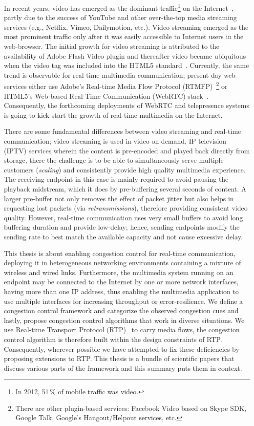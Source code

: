 In recent years, video has emerged as the dominant traffic\footnote{In 2012,
51\,\% of mobile traffic was video.} on the Internet~\cite{cvni.13,dawn.zb},
partly due to the success of YouTube and other over-the-top media streaming
services (e.g., Netflix, Vimeo, Dailymotion, etc.). Video streaming emerged as
the most prominent traffic only after it was easily accessible to Internet
users in the web-browser. The initial growth for video streaming is attributed
to the availability of Adobe Flash Video plugin and thereafter video became
ubiquitous when the video tag was included into the HTML5
standard~\cite{html5-spec}. Currently, the same trend is observable for real-time 
multimedia communication; present day web services either use Adobe's 
Real-time Media Flow Protocol (RTMFP)~\cite{draft.rtmfp}\footnote{There are other 
plugin-based services: Facebook Video based on Skype SDK, Google Talk, Google's
Hangout/Helpout services, etc.} or HTML5's Web-based Real-Time Communication
(WebRTC) stack~\cite{draft.webrtc}. Consequently, the forthcoming deployments
of WebRTC and telepresence systems is going to kick start the growth of 
real-time multimedia on the Internet.


There are some fundamental differences between video streaming and real-time
communication; video streaming is used in video on demand, IP television
(IPTV) services wherein the content is pre-encoded and played back directly
from storage, there the challenge is to be able to simultaneously serve
multiple customers (\emph{scaling}) and consistently provide high quality
multimedia experience. The receiving endpoint in this case is mainly required
to avoid pausing the playback midstream, which it does by pre-buffering
several seconds of content. A larger pre-buffer not only removes the effect of
packet jitter but also helps in requesting lost packets (via
\emph{retransmissions}), therefore providing consistent video quality.
However, real-time communication uses very small buffers to avoid long
buffering duration and provide low-delay; hence, sending endpoints modify the
sending rate to best match the available capacity and not cause excessive
delay.

This thesis is about enabling congestion control for real-time communication,
deploying it in heterogeneous networking environments containing a mixture of
wireless and wired links. Furthermore, the multimedia system running on an
endpoint may be connected to the Internet by one or more network interfaces,
having more than one IP address, thus enabling the multimedia application to
use multiple interfaces for increasing throughput or error-resilience. We
define a congestion control framework and categorize the observed congestion
cues and lastly, propose congestion control algorithms that work in diverse
situations. We use Real-time Transport Protocol (RTP)~\cite{rfc3550} to carry
media flows, the congestion control algorithm is therefore built within the
design constraints of RTP. Consequently, wherever possible we have attempted
to fix these deficiencies by proposing extensions to RTP. This thesis is a
bundle of scientific papers that discuss various parts of the framework and
this summary puts them in context.

